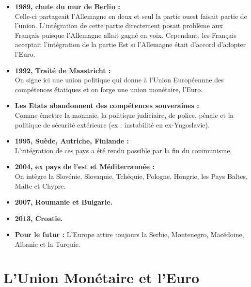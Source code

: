\begin{itemize}
	\item \textbf{1989, chute du mur de Berlin :} \\
	      Celle-ci partageait l'Allemagne en deux et seul la partie ouest faisait partie de l'union. L'intégration de cette partie directement posait problème aux Français puisque l'Allemagne allait gagné en voix. Cependant, les Français acceptait l'intégration de la partie Est si l'Allemagne était d'accord d'adopter l'Euro. 
	      	
	\item \textbf{1992, Traité de Maastricht :} \\
	      On signe ici une union politique qui donne à l'Union Européennne des compétences étatiques et on forge une union monétaire, l'Euro. 
	      	
	\item \textbf{Les Etats abandonnent des compétences souveraines :} \\
	      Comme émettre la monnaie, la politique judiciaire, de police, pénale et la politique de sécurité extérieure (ex : instabilité en ex-Yugoslavie).
	      
	\item \textbf{1995, Suède, Autriche, Finlande :} \\
	      L'intégration de ces pays a été rendu possible par la fin du communisme. 
	      	
	\item \textbf{2004, ex pays de l'est et Méditerrannée :} \\
	      On intègre la Slovénie, Slovaquie, Tchéquie, Pologne, Hongrie, les Pays Baltes, Malte et Chypre.
	      	
	\item \textbf{2007, Roumanie et Bulgarie.}
	      	
	\item \textbf{2013, Croatie.}
	      	
	\item \textbf{Pour le futur :}
	      L'Europe attire toujours la Serbie, Montenegro, Macédoine, Albanie et la Turquie.
\end{itemize}

\section{L'Union Monétaire et l'Euro}
